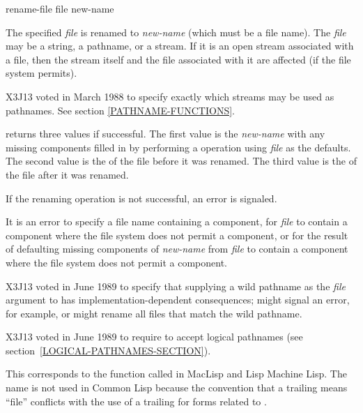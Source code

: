 \begin{defun}[Function]
rename-file file new-name

The specified {\it file} is renamed to {\it new-name} (which must be a file name).
The {\it file} may be a string, a pathname, or a stream.  If it is an open stream
associated with a file, then the stream itself and the file associated
with it are affected (if the file system permits).

\begin{new}
X3J13 voted in March 1988
to specify exactly which streams may be used as pathnames.
See section \ref{PATHNAME-FUNCTIONS}.
\end{new}

 returns three values if successful.  The first value
is the {\it new-name} with any missing components filled in by performing
a  operation using {\it file} as the defaults.
The second value is the  of the file before it was renamed.
The third value is the  of the file after it was renamed.

If the renaming operation is not successful, an error is signaled.

\begin{obsolete}
It is an error to specify a file name containing a  component,
for {\it file} to contain a {\nil} component where the file system does
not permit a {\nil} component, or for the result of defaulting missing
components of {\it new-name} from {\it file} to contain a {\nil} component
where the file system does not permit a {\nil} component.
\end{obsolete}
\begin{newer}
X3J13 voted in June 1989 
to specify that supplying a wild pathname
as the {\it file} argument to  has implementation-dependent consequences;
 might signal an error, for example,
or might rename all files that match the wild pathname.
\end{newer}

\begin{newer}
X3J13 voted in June 1989  to require 
to accept logical pathnames (see section~\ref{LOGICAL-PATHNAMES-SECTION}).
\end{newer}

\beforenoterule
\begin{incompatibility}
This corresponds to the function
called  in MacLisp and Lisp Machine Lisp.
The name  is not used in Common Lisp
because the convention that a trailing  means ``file''
conflicts with the use of a trailing 
for forms related to .
\end{incompatibility}
\afternoterule
\end{defun}


